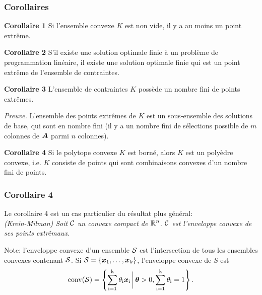 \documentclass[usepdftitle=false]{beamer}
\begin{document}
\begin{frame}
\frametitle{Corollaires}

{\bf Corollaire 1} Si l'ensemble convexe $K$ est non vide, il y a au moins un point extrême.

\mbox{}

{\bf Corollaire 2} S'il existe une solution optimale finie à un problème de programmation linéaire, il existe une solution optimale finie qui est un point extrême de l'ensemble de contraintes.

\mbox{}

{\bf Corollaire 3} L'ensemble de contraintes $K$ possède un nombre fini de points extrêmes.

{\it Preuve.} L'ensemble des points extrêmes de $K$ est un sous-ensemble des solutions de base, qui sont en nombre fini (il y a un nombre fini de sélections possible de $m$ colonnes de ${\boldsymbol{A}}$ parmi $n$ colonnes).

\mbox{}

{\bf Corollaire 4} 
Si le polytope convexe $K$ est borné, alors $K$ est un polyèdre convexe, i.e. $K$ consiste de points qui sont combinaisons convexes d'un nombre fini de points.
\end{frame}

\begin{frame}
\frametitle{Corollaire 4}

Le corollaire 4 est un cas particulier du résultat plus général:\\
\textit{(Krein-Milman) Soit ${\mathcal{C}}$ un convexe compact de ${\mathbb{R}}^n$. ${\mathcal{C}}$ est l’enveloppe
convexe de ses points extrêmaux.}

\mbox{}

Note: l'enveloppe convexe d'un ensemble ${\mathcal{S}}$ est l'intersection de tous les ensembles convexes contenant ${\mathcal{S}}$. Si ${\mathcal{S}} = \{ {\boldsymbol{x}}_1,\ldots,{\boldsymbol{x}}_k\}$, l'enveloppe convexe de $S$ est
$$
\rm{conv}({\mathcal{S}}) = \left\{ \sum_{i = 1}^k \theta_i {\boldsymbol{x}}_i \,\bigg|\, \boldsymbol{\theta} > 0, \sum_{i = 1}^k \theta_i = 1 \right\}.
$$

\end{frame}
\end{document}
